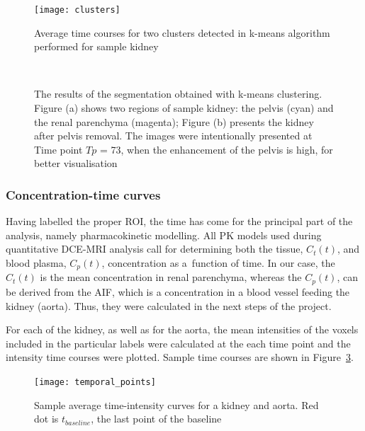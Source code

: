 \begin{figure}[H]
	\centering
	\texttt{[image: clusters]}
	
\caption[Average time courses for two clusters detected in k-means algorithm]{Average time courses for two clusters detected in k-means algorithm performed for sample kidney}
\label{fig:clusters}
\end{figure}

\begin{figure}[H]
\captionsetup[subfloat]{captionskip=0.5cm}
	\centering
	\hspace{0.02\textwidth}
	\\	
\vspace{0.5cm}
\caption[Sample kidney segmentation with k-means clustering]{The results of the segmentation obtained with k-means clustering. Figure (a) shows two regions of sample kidney: the pelvis (cyan) and the renal parenchyma (magenta); Figure (b) presents the kidney after pelvis removal. The images were intentionally presented at Time point $Tp$ = 73, when the enhancement of the pelvis is high, for better visualisation}
\label{fig:segmentation}
\end{figure}

\subsubsection{Concentration-time curves}
Having labelled the proper ROI, the time has come for the principal part of the analysis, namely pharmacokinetic modelling.
All PK models used during quantitative DCE-MRI analysis call for determining both the tissue, $C_t(t)$, and blood plasma, $C_p(t)$, concentration as a~function of time. In our case, the $C_t(t)$ is the mean concentration in renal parenchyma, whereas the
$C_p(t)$, can be derived from the AIF, which is a concentration in a blood vessel feeding the kidney (aorta).
Thus, they were calculated in the next steps of the project.  

For each of the kidney, as well as for the aorta, the mean intensities of the voxels included in the particular labels were calculated at the each time point and the intensity time courses were plotted. Sample time courses are shown in Figure~\ref{fig:temporal_points}.

\vspace{10pt}
\begin{figure}[H]
	\centering
	\texttt{[image: temporal\_points]}
	
\caption[Sample average time-intensity curves for a kidney and aorta with marked last points of the baseline]{Sample average time-intensity curves for a kidney and aorta. Red dot is $t_{baseline}$, the last point of the baseline}
\label{fig:temporal_points}
\end{figure}




